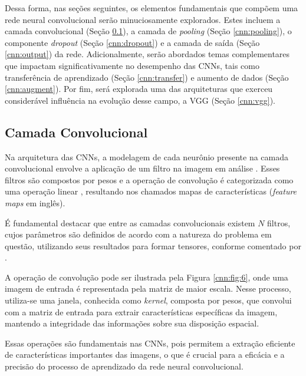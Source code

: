 Dessa forma, nas seções seguintes, os elementos fundamentais que compõem uma rede neural convolucional serão minuciosamente explorados. Estes incluem a camada convolucional (Seção \ref{cnn:conv}), a camada de \textit{pooling} (Seção \ref{cnn:pooling}), o componente \textit{dropout} (Seção \ref{cnn:dropout}) e a camada de saída (Seção \ref{cnn:output}) da rede. Adicionalmente, serão abordados temas complementares que impactam significativamente no desempenho das CNNs, tais como transferência de aprendizado (Seção \ref{cnn:transfer}) e aumento de dados (Seção \ref{cnn:augment}). Por fim, será explorada uma das arquiteturas que exerceu considerável influência na evolução desse campo, a VGG (Seção \ref{cnn:vgg}).


\subsection{Camada Convolucional}
\label{cnn:conv}

Na arquitetura das CNNs, a modelagem de cada neurônio presente na camada convolucional envolve a aplicação de um filtro na imagem em análise \citep{ponti2018funciona}. Esses filtros são compostos por pesos e a operação de convolução é categorizada como uma operação linear \citep{Goodfellow2016}, resultando nos chamados mapas de características (\textit{feature maps} em inglês).

É fundamental destacar que entre as camadas convolucionais existem $N$ filtros, cujos parâmetros são definidos de acordo com a natureza do problema em questão, utilizando seus resultados para formar tensores, conforme comentado por \cite{ponti2018funciona}.

A operação de convolução pode ser ilustrada pela Figura \ref{cnn:fig:6}, onde uma imagem de entrada é representada pela matriz de maior escala. Nesse processo, utiliza-se uma janela, conhecida como \textit{kernel}, composta por pesos, que convolui com a matriz de entrada para extrair características específicas da imagem, mantendo a integridade das informações sobre sua disposição espacial.

Essas operações são fundamentais nas CNNs, pois permitem a extração eficiente de características importantes das imagens, o que é crucial para a eficácia e a precisão do processo de aprendizado da rede neural convolucional.

